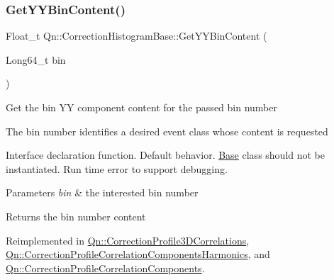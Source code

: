 \mbox{\label{classQn_1_1CorrectionHistogramBase_a1ebb8ccb23cce80b276670617f4c03e5}} 
\subsubsection{\texorpdfstring{Get\+Y\+Y\+Bin\+Content()}{GetYYBinContent()}\hspace{0.1cm}{\footnotesize\ttfamily [1/2]}}
{\footnotesize\ttfamily Float\+\_\+t Qn\+::\+Correction\+Histogram\+Base\+::\+Get\+Y\+Y\+Bin\+Content (\begin{DoxyParamCaption}\item[{Long64\+\_\+t}]{bin }\end{DoxyParamCaption})\hspace{0.3cm}{\ttfamily [virtual]}}

Get the bin YY component content for the passed bin number

The bin number identifies a desired event class whose content is requested

Interface declaration function. Default behavior. \mbox{\hyperlink{classBase}{Base}} class should not be instantiated. Run time error to support debugging.


\begin{DoxyParams}{Parameters}
{\em bin} & the interested bin number \\
\hline
\end{DoxyParams}
\begin{DoxyReturn}{Returns}
the bin number content 
\end{DoxyReturn}


Reimplemented in \mbox{\hyperlink{classQn_1_1CorrectionProfile3DCorrelations_ab911ed8b66eca8bcc200ed1abf843e7b}{Qn\+::\+Correction\+Profile3\+D\+Correlations}}, \mbox{\hyperlink{classQn_1_1CorrectionProfileCorrelationComponentsHarmonics_a17da16c438a33b56f2bb6ecdbca36ca7}{Qn\+::\+Correction\+Profile\+Correlation\+Components\+Harmonics}}, and \mbox{\hyperlink{classQn_1_1CorrectionProfileCorrelationComponents_a6af717d8880002afe43b294f1a152546}{Qn\+::\+Correction\+Profile\+Correlation\+Components}}.

\mbox{\label{classQn_1_1CorrectionHistogramBase_a65c27d6aca78e2ada1be160c48958c3e}} 
